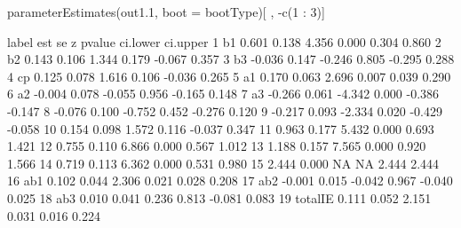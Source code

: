 \begin{Schunk}
\begin{Sinput}
 parameterEstimates(out1.1, boot = bootType)[ , -c(1 : 3)]
\end{Sinput}
\begin{Soutput}
     label    est    se      z pvalue ci.lower ci.upper
1       b1  0.601 0.138  4.356  0.000    0.304    0.860
2       b2  0.143 0.106  1.344  0.179   -0.067    0.357
3       b3 -0.036 0.147 -0.246  0.805   -0.295    0.288
4       cp  0.125 0.078  1.616  0.106   -0.036    0.265
5       a1  0.170 0.063  2.696  0.007    0.039    0.290
6       a2 -0.004 0.078 -0.055  0.956   -0.165    0.148
7       a3 -0.266 0.061 -4.342  0.000   -0.386   -0.147
8          -0.076 0.100 -0.752  0.452   -0.276    0.120
9          -0.217 0.093 -2.334  0.020   -0.429   -0.058
10          0.154 0.098  1.572  0.116   -0.037    0.347
11          0.963 0.177  5.432  0.000    0.693    1.421
12          0.755 0.110  6.866  0.000    0.567    1.012
13          1.188 0.157  7.565  0.000    0.920    1.566
14          0.719 0.113  6.362  0.000    0.531    0.980
15          2.444 0.000     NA     NA    2.444    2.444
16     ab1  0.102 0.044  2.306  0.021    0.028    0.208
17     ab2 -0.001 0.015 -0.042  0.967   -0.040    0.025
18     ab3  0.010 0.041  0.236  0.813   -0.081    0.083
19 totalIE  0.111 0.052  2.151  0.031    0.016    0.224
\end{Soutput}
\end{Schunk}

